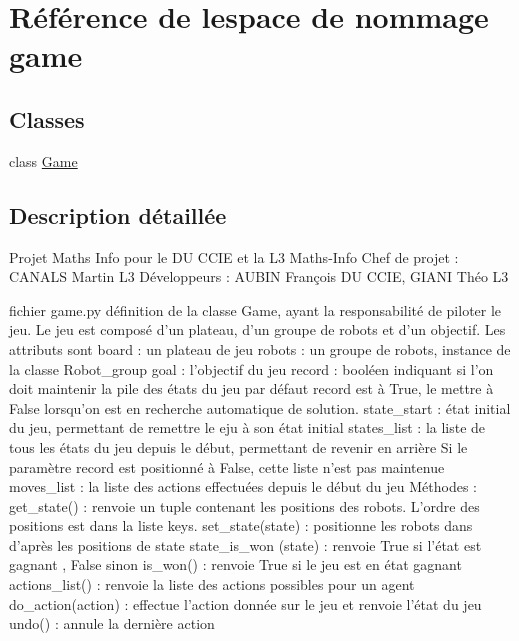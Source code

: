 \hypertarget{namespacegame}{}\section{Référence de l\textquotesingle{}espace de nommage game}
\label{namespacegame}
\subsection*{Classes}
\begin{DoxyCompactItemize}
\item 
class \hyperlink{classgame_1_1Game}{Game}
\end{DoxyCompactItemize}


\subsection{Description détaillée}
\begin{DoxyVerb}Projet Maths Info pour le DU CCIE et la L3 Maths-Info
Chef de projet : CANALS Martin L3
Développeurs : AUBIN François DU CCIE, GIANI Théo L3

fichier game.py
définition de la classe Game, ayant la responsabilité de piloter le jeu.
Le jeu est composé d'un plateau, d'un groupe de robots et d'un objectif.
Les attributs sont
board : un plateau de jeu
robots : un groupe de robots, instance de la classe Robot_group
goal : l'objectif du jeu
record : booléen indiquant si l'on doit maintenir la pile des états du jeu
par défaut record est à True, le mettre à False lorsqu'on est en recherche automatique de solution.
state_start : état initial du jeu, permettant de remettre le eju à son état initial
states_list : la liste de tous les états du jeu depuis le début,
        permettant de revenir en arrière
    Si le paramètre record est positionné à False, cette liste n'est pas maintenue
moves_list : la liste des actions effectuées depuis le début du jeu
Méthodes :
get_state() :
    renvoie un tuple contenant les positions des robots.
    L'ordre des positions est dans la liste keys.
set_state(state) :
    positionne les robots dans d'après les positions de state
state_is_won (state) :
    renvoie True si l'état est gagnant , False sinon
is_won() :
    renvoie True si le jeu est en état gagnant
actions_list() :
    renvoie la liste des actions possibles pour un agent
do_action(action) :
    effectue l'action donnée sur le jeu et renvoie l'état du jeu
undo() :
    annule la dernière action
\end{DoxyVerb}
 